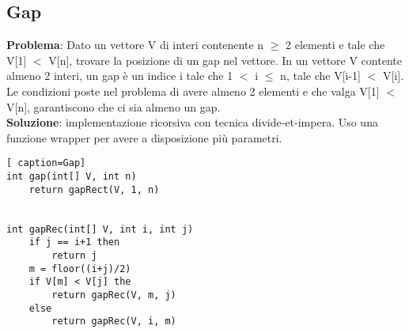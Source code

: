 \documentclass[../cheatSheetAlgoritmi.tex]{subfiles}
\begin{document}
\subsection{Gap}
\textbf{Problema}: Dato un vettore V di interi contenente n $\geq$ 2 elementi e tale che V[1] $<$ V[n], trovare la posizione di un gap nel vettore. In un vettore V contente almeno 2 interi, un gap è un indice i tale che 1 $<$ i $\leq$ n, tale che V[i-1] $<$ V[i]. Le condizioni poste nel problema di avere almeno 2 elementi e che valga V[1] $<$ V[n], garantiscono che ci sia almeno un gap.\\
\textbf{Soluzione}: implementazione ricorsiva con tecnica divide-et-impera. Uso una funzione wrapper per avere a disposizione più parametri.
\newpage
\begin{lstlisting}[ caption=Gap]
int gap(int[] V, int n)
	return gapRect(V, 1, n)
	

int gapRec(int[] V, int i, int j)
	if j == i+1 then
		return j
	m = floor((i+j)/2)
	if V[m] < V[j] the
		return gapRec(V, m, j)
	else 
		return gapRec(V, i, m)
\end{lstlisting}\
\\\\
\end{document}
